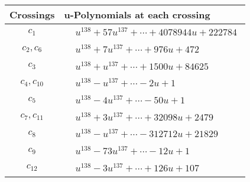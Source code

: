 \documentclass[1p]{elsarticle_modified}
\theoremstyle{definition}
\begin{document}
\begin{tabular}{m{50pt}|m{274pt}}
Crossings & \hspace{64pt}u-Polynomials at each crossing \\
\hline $$\begin{aligned}c_{1}\end{aligned}$$&$\begin{aligned}
&u^{138}+57 u^{137}+\cdots+4078944 u+222784
\end{aligned}$\\
\hline $$\begin{aligned}c_{2},c_{6}\end{aligned}$$&$\begin{aligned}
&u^{138}+7 u^{137}+\cdots+976 u+472
\end{aligned}$\\
\hline $$\begin{aligned}c_{3}\end{aligned}$$&$\begin{aligned}
&u^{138}+u^{137}+\cdots+1500 u+84625
\end{aligned}$\\
\hline $$\begin{aligned}c_{4},c_{10}\end{aligned}$$&$\begin{aligned}
&u^{138}- u^{137}+\cdots-2 u+1
\end{aligned}$\\
\hline $$\begin{aligned}c_{5}\end{aligned}$$&$\begin{aligned}
&u^{138}-4 u^{137}+\cdots-50 u+1
\end{aligned}$\\
\hline $$\begin{aligned}c_{7},c_{11}\end{aligned}$$&$\begin{aligned}
&u^{138}+3 u^{137}+\cdots+32098 u+2479
\end{aligned}$\\
\hline $$\begin{aligned}c_{8}\end{aligned}$$&$\begin{aligned}
&u^{138}- u^{137}+\cdots-312712 u+21829
\end{aligned}$\\
\hline $$\begin{aligned}c_{9}\end{aligned}$$&$\begin{aligned}
&u^{138}-73 u^{137}+\cdots-12 u+1
\end{aligned}$\\
\hline $$\begin{aligned}c_{12}\end{aligned}$$&$\begin{aligned}
&u^{138}-3 u^{137}+\cdots+126 u+107
\end{aligned}$\\
\hline
\end{tabular}\\~\\
\end{document}
